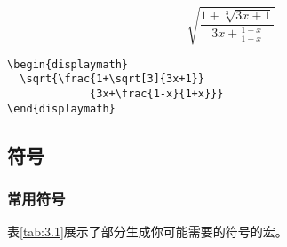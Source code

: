 \begin{codelist}[3.2]{
  \begin{displaymath}
    \sqrt{\frac{1+\sqrt[3]{3x+1}}
              {3x+\frac{1-x}{1+x}}}
  \end{displaymath}
}\begin{verbatim}
\begin{displaymath}
  \sqrt{\frac{1+\sqrt[3]{3x+1}}
             {3x+\frac{1-x}{1+x}}}
\end{displaymath}
\end{verbatim}
\end{codelist}

\subsection{符号}

\subsubsection{常用符号}

表\ref{tab:3.1}展示了部分生成你可能需要的符号的宏。

